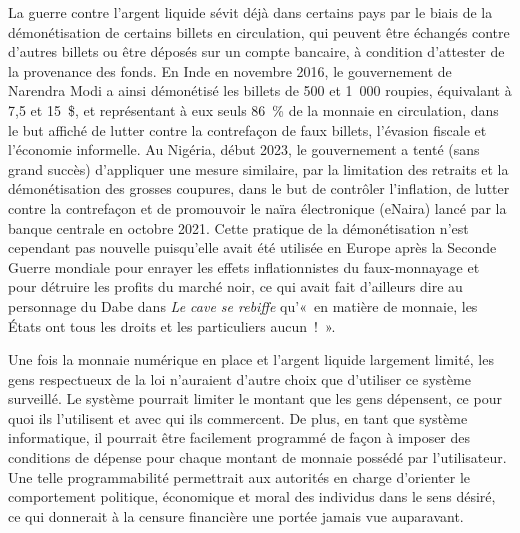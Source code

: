La guerre contre l'argent liquide sévit déjà dans certains pays par le biais de la démonétisation de certains billets en circulation, qui peuvent être échangés contre d'autres billets ou être déposés sur un compte bancaire, à condition d'attester de la provenance des fonds. En Inde en novembre 2016, le gouvernement de Narendra Modi a ainsi démonétisé les billets de 500 et 1~000 roupies, équivalant à 7,5 et 15~\$, et représentant à eux seuls 86~\% de la monnaie en circulation, dans le but affiché de lutter contre la contrefaçon de faux billets, l'évasion fiscale et l'économie informelle. Au Nigéria, début 2023, le gouvernement a tenté (sans grand succès) d'appliquer une mesure similaire, par la limitation des retraits et la démonétisation des grosses coupures, dans le but de contrôler l'inflation, de lutter contre la contrefaçon et de promouvoir le naïra électronique (eNaira) lancé par la banque centrale en octobre 2021. Cette pratique de la démonétisation n'est cependant pas nouvelle puisqu'elle avait été utilisée en Europe après la Seconde Guerre mondiale pour enrayer les effets inflationnistes du faux-monnayage et pour détruire les profits du marché noir, ce qui avait fait d'ailleurs dire au personnage du Dabe dans \emph{Le cave se rebiffe} qu'«~en matière de monnaie, les États ont tous les droits et les particuliers aucun~!~».


Une fois la monnaie numérique en place et l'argent liquide largement limité, les gens respectueux de la loi n'auraient d'autre choix que d'utiliser ce système surveillé. Le système pourrait limiter le montant que les gens dépensent, ce pour quoi ils l'utilisent et avec qui ils commercent. De plus, en tant que système informatique, il pourrait être facilement programmé de façon à imposer des conditions de dépense pour chaque montant de monnaie possédé par l'utilisateur. Une telle programmabilité permettrait aux autorités en charge d'orienter le comportement politique, économique et moral des individus dans le sens désiré, ce qui donnerait à la censure financière une portée jamais vue auparavant.

